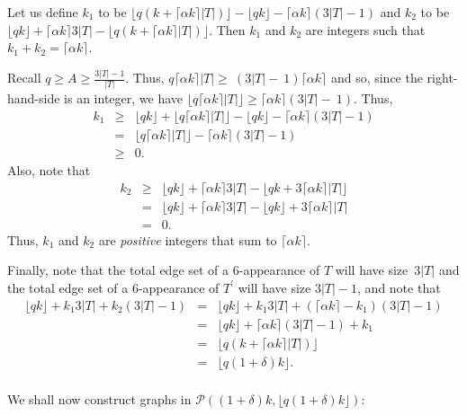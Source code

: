 \documentclass{article}
\newtheorem{Proof of Theorem}{Proof of Theorem}
\begin{document}
Let us define
$k_{1}$ to be $\lfloor q(k+ \lceil \alpha k \rceil |T|) \rfloor - \lfloor qk \rfloor 
- \lceil \alpha k \rceil (3|T|-1)$
and $k_{2}$ to be $\lfloor qk \rfloor +\lceil \alpha k \rceil 3|T|
-\lfloor q(k+\lceil \alpha k \rceil |T|) \rfloor$.
Then $k_{1}$ and $k_{2}$ are integers such that $k_{1} + k_{2} = \lceil \alpha k \rceil$.

Recall $q \geq A \geq \frac{3|T|-1}{|T|}$.
Thus,
$q \lceil \alpha k \rceil |T| \geq~(3|T|-~1) \lceil \alpha k \rceil$
and so, since the right-hand-side is an integer,
we have 
$\lfloor q \lceil \alpha k \rceil |T| \rfloor \geq \lceil \alpha k \rceil (3|T|-~1)$.
Thus,
\begin{eqnarray*}
k_{1} & \geq & \lfloor qk \rfloor + \lfloor q \lceil \alpha k \rceil |T| \rfloor - \lfloor qk \rfloor 
- \lceil \alpha k \rceil (3|T|-1) \\
& = & \lfloor q \lceil \alpha k \rceil |T| \rfloor 
- \lceil \alpha k \rceil (3|T|-1) \\
& \geq & 0.
\end{eqnarray*}
Also, note that
\begin{eqnarray*}
k_{2} & \geq & \lfloor qk \rfloor + \lceil \alpha k \rceil 3|T|
- \lfloor qk+ 3 \lceil \alpha k \rceil |T| \rfloor \\
& = & \lfloor qk \rfloor + \lceil \alpha k \rceil 3|T|
- \lfloor qk \rfloor + 3 \lceil \alpha k \rceil |T| \\
& = & 0.
\end{eqnarray*}
Thus, $k_{1}$ and $k_{2}$ are \textit{positive} integers that sum to $\lceil \alpha k \rceil$.

Finally, note that the total edge set of a $6$-appearance of $T$ will have size~$3|T|$
and the total edge set of a $6$-appearance of $T^{\prime}$ will have size $3|T|-1$,
and note that
\begin{eqnarray*}
\lfloor qk \rfloor + k_{1} 3 |T| + k_{2} (3|T|-1) 
& = & \lfloor qk \rfloor + k_{1} 3 |T| + ( \lceil \alpha k \rceil - k_{1}) (3|T|-1) \\
& = & \lfloor qk \rfloor + \lceil \alpha k \rceil (3|T|-1) + k_{1} \\
& = & \lfloor q(k+ \lceil \alpha k \rceil |T|) \rfloor \\
& = & \lfloor q(1+\delta)k \rfloor. \\
\end{eqnarray*} 

We shall now construct graphs in $\mathcal{P}((1+\delta)k, \lfloor q(1+\delta)k \rfloor)$:
\end{document}
